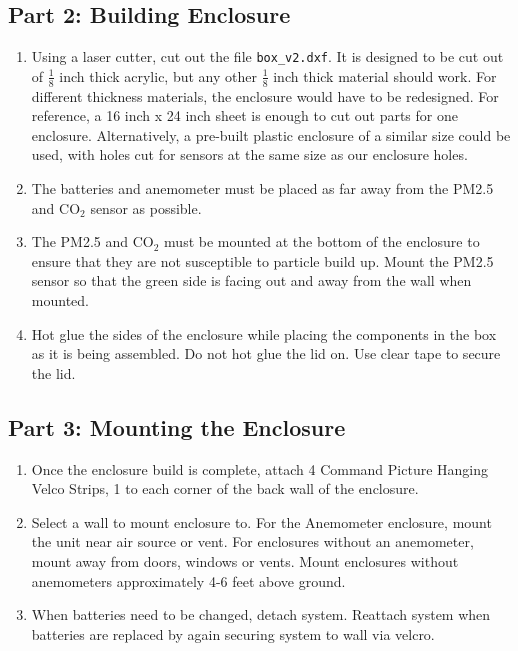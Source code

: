 \subsection{Part 2: Building Enclosure}
\begin{enumerate}

\item Using a laser cutter, cut out the file \texttt{box\_v2.dxf}. It is designed to be cut out of $\frac{1}{{8}}$ inch thick acrylic, but any other $\frac{1}{{8}}$ inch thick material should work. For different thickness materials, the enclosure would have to be redesigned. For reference, a 16 inch x 24 inch sheet is enough to cut out parts for one enclosure. Alternatively, a pre-built plastic enclosure of a similar size could be used, with holes cut for sensors at the same size as our enclosure holes.
\item The batteries and anemometer must be placed as far away from the PM2.5 and CO$_2$ sensor as possible. 
\item The PM2.5 and CO$_2$ must be mounted at the bottom of the enclosure to ensure that they are not susceptible to particle build up. Mount the PM2.5 sensor so that the green side is facing out and away from the wall when mounted.
\item Hot glue the sides of the enclosure while placing the components in the box as it is being assembled. Do not hot glue the lid on. Use clear tape to secure the lid.
\end{enumerate}

\subsection{Part 3: Mounting the Enclosure}
\begin{enumerate}
    \item Once the enclosure build is complete, attach 4 Command Picture Hanging Velco Strips, 1 to each corner of the back wall of the enclosure.
    \item Select a wall to mount enclosure to. For the Anemometer enclosure, mount the unit near air source or vent. For enclosures without an anemometer, mount away from doors, windows or vents. Mount enclosures without anemometers approximately 4-6 feet above ground. 
    \item When batteries need to be changed, detach system. Reattach system when batteries are replaced by again securing system to wall via velcro. 
\end{enumerate}